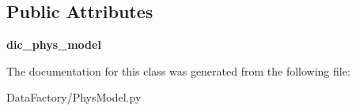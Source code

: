 \subsection*{Public Attributes}
\begin{DoxyCompactItemize}
\item 
\mbox{\label{classMIS_1_1DataFactory_1_1PhysModel_1_1PhysModel_a4ddc18070e13a4252f31d43a67824d77}} 
{\bfseries dic\+\_\+phys\+\_\+model}
\end{DoxyCompactItemize}


The documentation for this class was generated from the following file\+:\begin{DoxyCompactItemize}
\item 
Data\+Factory/Phys\+Model.\+py\end{DoxyCompactItemize}

